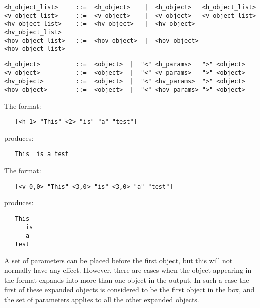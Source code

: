 \begin{small}\begin{verbatim}
<h_object_list>     ::=  <h_object>    |  <h_object>   <h_object_list>
<v_object_list>     ::=  <v_object>    |  <v_object>   <v_object_list>
<hv_object_list>    ::=  <hv_object>   |  <hv_object>  <hv_object_list>
<hov_object_list>   ::=  <hov_object>  |  <hov_object> <hov_object_list>
\end{verbatim}\end{small}

\begin{small}\begin{verbatim}
<h_object>          ::=  <object>  |  "<" <h_params>   ">" <object>
<v_object>          ::=  <object>  |  "<" <v_params>   ">" <object>
<hv_object>         ::=  <object>  |  "<" <hv_params>  ">" <object>
<hov_object>        ::=  <object>  |  "<" <hov_params> ">" <object>
\end{verbatim}\end{small}

\noindent
The format:

\begin{small}\begin{verbatim}
   [<h 1> "This" <2> "is" "a" "test"]
\end{verbatim}\end{small}

\noindent
produces:

\begin{small}\begin{verbatim}
   This  is a test
\end{verbatim}\end{small}

\noindent
The format:

\begin{small}\begin{verbatim}
   [<v 0,0> "This" <3,0> "is" <3,0> "a" "test"]
\end{verbatim}\end{small}

\noindent
produces:

\begin{small}\begin{verbatim}
   This
      is
      a
   test
\end{verbatim}\end{small}

\noindent
A set of parameters can be placed before the first object, but this will not
normally have any effect. However, there are cases when the object appearing
in the format expands into more than one object in the output. In such a case
the first of these expanded objects is considered to be the first object in
the box, and the set of parameters applies to all the other expanded objects.


